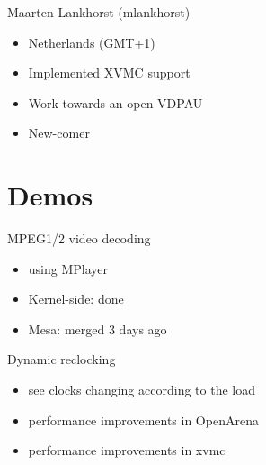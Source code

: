 \documentclass[11pt,english,compress]{beamer}
\begin{document}
		\begin{frame}
			\begin{block}{Maarten Lankhorst (mlankhorst)}
				\begin{itemize}
					\item Netherlands (GMT+1)
					\item Implemented XVMC support
					\item Work towards an open VDPAU
					\item New-comer
				\end{itemize}
			\end{block}
		\end{frame}

\section{Demos}
	\begin{frame}
		\begin{block}{MPEG1/2 video decoding}
			\begin{itemize}
				\item using MPlayer
				\item Kernel-side: done
				\item Mesa: merged 3 days ago
			\end{itemize}
		\end{block}
	\end{frame}

	\begin{frame}
		\begin{block}{Dynamic reclocking}
			\begin{itemize}
				\item see clocks changing according to the load
				\item performance improvements in OpenArena
				\item performance improvements in xvmc
			\end{itemize}
		\end{block}
	\end{frame}
\end{document}
